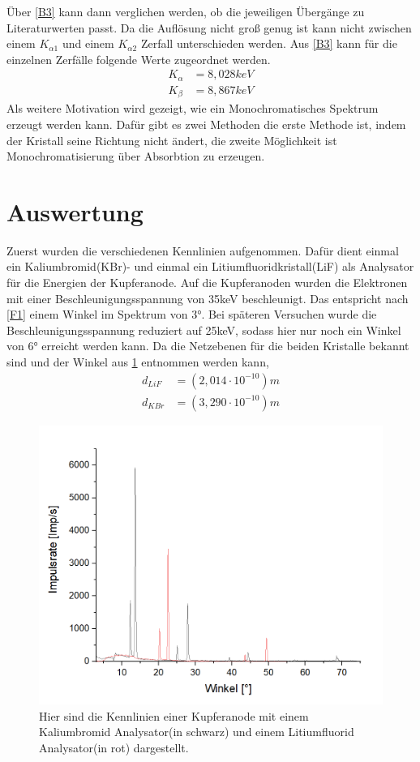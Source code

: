 \documentclass[
	a4paper,
	12pt,
	pagesize,
	ngerman
]{scrartcl}
\begin{document}
Über \cref{B3} kann dann verglichen werden, ob die jeweiligen Übergänge zu Literaturwerten passt. Da die Auflösung nicht groß genug ist kann nicht zwischen einem $K_{\alpha1}$ und einem $K_{\alpha2}$ Zerfall unterschieden werden. Aus \cref{B3} kann für die einzelnen Zerfälle folgende Werte zugeordnet werden.
\begin{align*}
    K_{\alpha} &= 8,028 keV \\
    K_{\beta} &= 8,867 keV
\end{align*}
Als weitere Motivation wird gezeigt, wie ein Monochromatisches Spektrum erzeugt werden kann. Dafür gibt es zwei Methoden die erste Methode ist, indem der Kristall seine Richtung nicht ändert, die zweite Möglichkeit ist Monochromatisierung über Absorbtion zu erzeugen.


\section{Auswertung}
Zuerst wurden die verschiedenen Kennlinien aufgenommen. Dafür dient einmal ein Kaliumbromid(KBr)- und einmal ein Litiumfluoridkristall(LiF) als Analysator für die Energien der Kupferanode. Auf die Kupferanoden wurden die Elektronen mit einer Beschleunigungsspannung von 35keV beschleunigt. Das entspricht nach \cref{F1} einem Winkel im Spektrum von 3°. Bei späteren Versuchen wurde die Beschleunigungsspannung reduziert auf 25keV, sodass hier nur noch ein Winkel von 6° erreicht werden kann. Da die Netzebenen für die beiden Kristalle bekannt sind und der Winkel aus \cref{A1} entnommen werden kann,
\begin{align*}
    d_{LiF} &= (2,014 \cdot 10^{-10})m \\
    d_{KBr} &= (3,290 \cdot 10^{-10})m  
\end{align*}
\begin{figure}[h!]
    \centering
    \includegraphics[scale = 0.6]{lif-kbr.png}
    \caption{Hier sind die Kennlinien einer Kupferanode mit einem Kaliumbromid Analysator(in schwarz) und einem Litiumfluorid Analysator(in rot) dargestellt.}
    \label{A1}
\end{figure}
\end{document}
